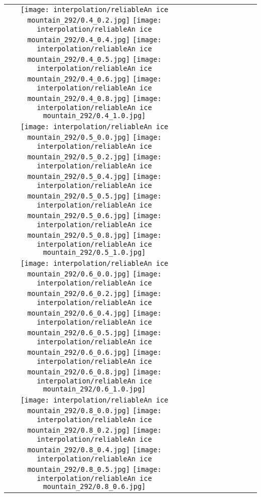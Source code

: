 \documentclass[10pt,twocolumn,letterpaper]{article}
\begin{document}
\begin{figure*}[tb!]
{\begin{tabular}{c c c c c c c c c c}
  \texttt{[image: interpolation/reliableAn ice mountain\_292/0.4\_0.2.jpg]}
  \texttt{[image: interpolation/reliableAn ice mountain\_292/0.4\_0.4.jpg]}
  \texttt{[image: interpolation/reliableAn ice mountain\_292/0.4\_0.5.jpg]}
  \texttt{[image: interpolation/reliableAn ice mountain\_292/0.4\_0.6.jpg]}
  \texttt{[image: interpolation/reliableAn ice mountain\_292/0.4\_0.8.jpg]}
  \texttt{[image: interpolation/reliableAn ice mountain\_292/0.4\_1.0.jpg]}
\tabularnewline
    \raisebox{0.1in}{\rotatebox{90}{\small \emph{}
 }}
  \texttt{[image: interpolation/reliableAn ice mountain\_292/0.5\_0.0.jpg]}
  \texttt{[image: interpolation/reliableAn ice mountain\_292/0.5\_0.2.jpg]}
  \texttt{[image: interpolation/reliableAn ice mountain\_292/0.5\_0.4.jpg]}
  \texttt{[image: interpolation/reliableAn ice mountain\_292/0.5\_0.5.jpg]}
  \texttt{[image: interpolation/reliableAn ice mountain\_292/0.5\_0.6.jpg]}
  \texttt{[image: interpolation/reliableAn ice mountain\_292/0.5\_0.8.jpg]}
  \texttt{[image: interpolation/reliableAn ice mountain\_292/0.5\_1.0.jpg]}
\tabularnewline
    \raisebox{0.1in}{\rotatebox{90}{\small \emph{}
 }}
  \texttt{[image: interpolation/reliableAn ice mountain\_292/0.6\_0.0.jpg]}
  \texttt{[image: interpolation/reliableAn ice mountain\_292/0.6\_0.2.jpg]}
  \texttt{[image: interpolation/reliableAn ice mountain\_292/0.6\_0.4.jpg]}
  \texttt{[image: interpolation/reliableAn ice mountain\_292/0.6\_0.5.jpg]}
  \texttt{[image: interpolation/reliableAn ice mountain\_292/0.6\_0.6.jpg]}
  \texttt{[image: interpolation/reliableAn ice mountain\_292/0.6\_0.8.jpg]}
  \texttt{[image: interpolation/reliableAn ice mountain\_292/0.6\_1.0.jpg]}
\tabularnewline
    \raisebox{0.1in}{\rotatebox{90}{\small \emph{}
 }}
  \texttt{[image: interpolation/reliableAn ice mountain\_292/0.8\_0.0.jpg]}
  \texttt{[image: interpolation/reliableAn ice mountain\_292/0.8\_0.2.jpg]}
   \texttt{[image: interpolation/reliableAn ice mountain\_292/0.8\_0.4.jpg]}
  \texttt{[image: interpolation/reliableAn ice mountain\_292/0.8\_0.5.jpg]}
  \texttt{[image: interpolation/reliableAn ice mountain\_292/0.8\_0.6.jpg]}

\end{tabular}}
\end{figure*}
\end{document}
